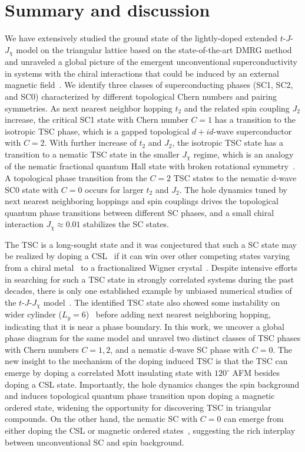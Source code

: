 \documentclass[aps,prx,reprint,superscriptaddress,showpacs]{revtex4-2}
\newcommand{\oim}[1]{{\color{blue} #1}}
\begin{document}
\section{Summary and discussion}
\label{summary}
We have extensively studied the ground state of the lightly-doped extended $t$-$J$-$J_{\chi}$ model on the triangular  lattice based on the state-of-the-art DMRG method and   unraveled  a global picture of the emergent unconventional superconductivity in systems with the chiral interactions that could be induced by an external magnetic field~\cite{jiang2020topological}. \oim {We identify three classes of superconducting phases (SC1, SC2, and SC0)  characterized by different topological Chern numbers and pairing symmetries. As next nearest neighbor hopping $t_{2}$ and the related spin coupling $J_{2}$ increase, the critical SC1 state  with  Chern number $C=1$ has a transition to the isotropic TSC
phase, which is a gapped topological $d+id$-wave superconductor with $C=2$. 
 With further increase of $t_{2}$ and $J_{2}$, the  isotropic TSC state has a transition to a nematic TSC state in the smaller $J_{\chi}$ regime, which is an analogy of the nematic fractional quantum Hall state with broken rotational symmetry~\cite{you2014theory,yang2017anisotropic,regnault2017evidence}. A topological phase transition from the $C=2$ TSC states to the nematic d-wave SC0 state with  $C=0$ occurs for larger  $t_{2}$ and $J_{2}$. } The hole dynamics tuned by next nearest neighboring hoppings and spin couplings drives the topological quantum phase transitions between different SC phases, and a small chiral interaction $J_{\chi}\approx 0.01$ stabilizes the SC states.  


The TSC is a long-sought state and  it was conjectured that such a SC state may be realized  by doping a CSL~\cite{kalmeyer1987equivalence, wen1989chiral} if it can win over other competing states varying from a chiral metal~\cite{song2021doping, zhu2022doped} to a fractionalized Wigner crystal~\cite{jiang2017holon,peng2021}. Despite intensive efforts in searching for such  a TSC state in strongly correlated systems  during the past decades, there is only one established example  by unbiased numerical studies  of the  $t$-$J$-$J_{\chi}$ model~\cite{jiang2020topological}. The identified TSC state also showed some  instability on wider cylinder ($L_{y}=6$)~\cite{jiang2020topological} before adding next nearest neighboring hopping, indicating that it is near a phase boundary. \oim{In this work, we uncover a global phase diagram  for  the same  model and unravel  two distinct classes of TSC phases with Chern numbers $C=1,2$, and a nematic d-wave SC phase with $C=0$.} The new insight to the mechanism of the doping induced TSC is that  the TSC can emerge by doping a correlated Mott insulating state with $120^{\circ}$ AFM besides doping a CSL  state. Importantly, the hole dynamics changes the spin background and induces topological quantum phase transition upon doping a magnetic ordered state, widening the opportunity for discovering TSC in triangular compounds. On the other hand, the nematic SC with $C=0$ can emerge from either doping the CSL or magnetic ordered states~\cite{gong2017global}, suggesting  the rich interplay between unconventional SC and spin background.
\end{document}
